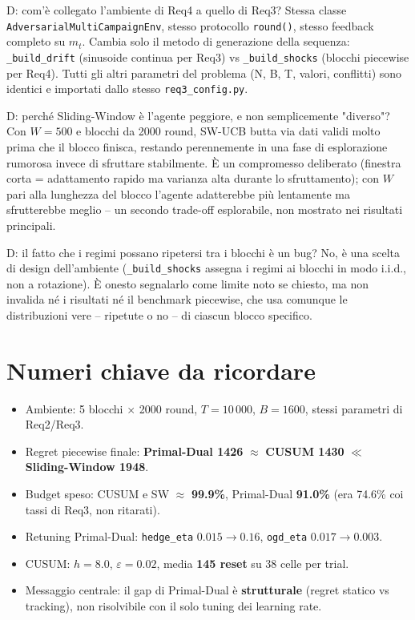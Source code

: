 \documentclass[11pt]{article}
\begin{document}
\begin{qabox}{D: com'è collegato l'ambiente di Req4 a quello di Req3?}
Stessa classe \texttt{AdversarialMultiCampaignEnv}, stesso protocollo \texttt{round()}, stesso feedback completo su $m_t$. Cambia solo il metodo di generazione della sequenza: \texttt{\_build\_drift} (sinusoide continua per Req3) vs \texttt{\_build\_shocks} (blocchi piecewise per Req4). Tutti gli altri parametri del problema (N, B, T, valori, conflitti) sono identici e importati dallo stesso \texttt{req3\_config.py}.
\end{qabox}

\begin{qabox}{D: perché Sliding-Window è l'agente peggiore, e non semplicemente "diverso"?}
Con $W=500$ e blocchi da 2000 round, SW-UCB butta via dati validi molto prima che il blocco finisca, restando perennemente in una fase di esplorazione rumorosa invece di sfruttare stabilmente. \`E un compromesso deliberato (finestra corta = adattamento rapido ma varianza alta durante lo sfruttamento); con $W$ pari alla lunghezza del blocco l'agente adatterebbe più lentamente ma sfrutterebbe meglio -- un secondo trade-off esplorabile, non mostrato nei risultati principali.
\end{qabox}

\begin{qabox}{D: il fatto che i regimi possano ripetersi tra i blocchi è un bug?}
No, è una scelta di design dell'ambiente (\texttt{\_build\_shocks} assegna i regimi ai blocchi in modo i.i.d., non a rotazione). \`E onesto segnalarlo come limite noto se chiesto, ma non invalida né i risultati né il benchmark piecewise, che usa comunque le distribuzioni vere -- ripetute o no -- di ciascun blocco specifico.
\end{qabox}

\section{Numeri chiave da ricordare}

\begin{keybox}
\begin{itemize}
\item Ambiente: 5 blocchi $\times$ 2000 round, $T=10\,000$, $B=1600$, stessi parametri di Req2/Req3.
\item Regret piecewise finale: \textbf{Primal-Dual 1426} $\approx$ \textbf{CUSUM 1430} $\ll$ \textbf{Sliding-Window 1948}.
\item Budget speso: CUSUM e SW $\approx$ \textbf{99.9\%}, Primal-Dual \textbf{91.0\%} (era 74.6\% coi tassi di Req3, non ritarati).
\item Retuning Primal-Dual: \texttt{hedge\_eta} $0.015 \to 0.16$, \texttt{ogd\_eta} $0.017 \to 0.003$.
\item CUSUM: $h=8.0$, $\varepsilon=0.02$, media \textbf{145 reset} su 38 celle per trial.
\item Messaggio centrale: il gap di Primal-Dual è \textbf{strutturale} (regret statico vs tracking), non risolvibile con il solo tuning dei learning rate.
\end{itemize}
\end{keybox}
\end{document}

